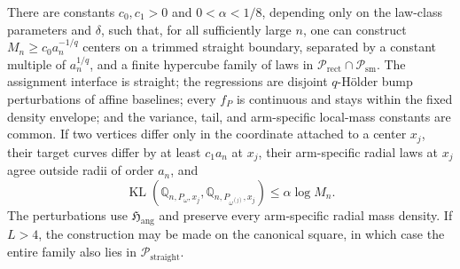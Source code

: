 There are constants \(c_0,c_1>0\) and \(0<\alpha<1/8\), depending only on the law-class parameters and \(\delta\), such that, for all sufficiently large \(n\), one can construct \(M_n\geq c_0a_n^{-1/q}\) centers on a trimmed straight boundary, separated by a constant multiple of \(a_n^{1/q}\), and a finite hypercube family of laws in \(\mathcal P_{\mathrm{rect}}\cap\mathcal P_{\mathrm{sm}}\).  The assignment interface is straight; the regressions are disjoint \(q\)-H\"older bump perturbations of affine baselines; every \(f_P\) is continuous and stays within the fixed density envelope; and the variance, tail, and arm-specific local-mass constants are common.  If two vertices differ only in the coordinate attached to a center \(x_j\), their target curves differ by at least \(c_1a_n\) at \(x_j\), their arm-specific radial laws at \(x_j\) agree outside radii of order \(a_n\), and
\[
 \operatorname{KL}\!\left(\mathbb Q_{n,P_\omega,x_j},\mathbb Q_{n,P_{\omega^{(j)}},x_j}\right)
 \leq\alpha\log M_n.
\]
The perturbations use \(\mathfrak H_{\mathrm{ang}}\) and preserve every arm-specific radial mass density.  If \(L>4\), the construction may be made on the canonical square, in which case the entire family also lies in \(\mathcal P_{\mathrm{straight}}\).